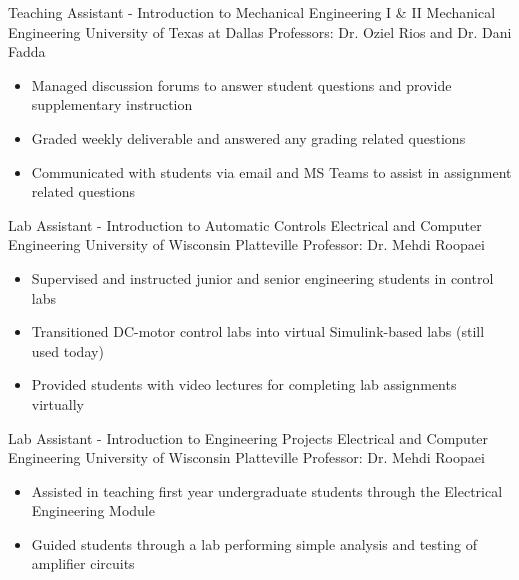 \documentclass[11pt,letterpaper,roman]{moderncv} %
\begin{document}

{Teaching Assistant - Introduction to Mechanical Engineering I \& II}
{Mechanical Engineering}
{University of Texas at Dallas}
{Professors: Dr. Oziel Rios and Dr. Dani Fadda}
{\begin{itemize}
    \item Managed discussion forums to answer student questions and provide supplementary instruction
    \item Graded weekly deliverable and answered any grading related questions
    \item Communicated with students via email and MS Teams to assist in assignment related questions
\end{itemize}
}

{Lab Assistant - Introduction to Automatic Controls}
{Electrical and Computer Engineering}
{University of Wisconsin Platteville}
{Professor: Dr. Mehdi Roopaei}
{\begin{itemize}
    \item Supervised and instructed junior and senior engineering students in control labs
    \item Transitioned DC-motor control labs into virtual Simulink-based labs (still used today)
    \item Provided students with video lectures for completing lab assignments virtually
\end{itemize}
}

{Lab Assistant - Introduction to Engineering Projects}
{Electrical and Computer Engineering}
{University of Wisconsin Platteville}
{Professor: Dr. Mehdi Roopaei}
{\begin{itemize}
    \item Assisted in teaching first year undergraduate students through the Electrical Engineering Module
    \item Guided students through a lab performing simple analysis and testing of amplifier circuits
\end{itemize}
}
\end{document}
